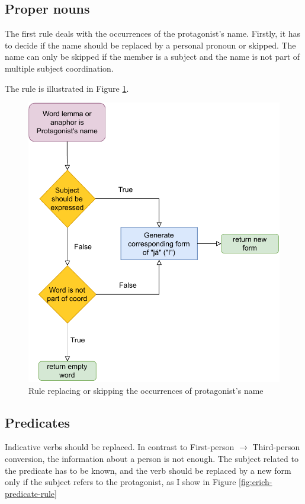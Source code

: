 \subsection{Proper nouns}

The first rule deals with the occurrences of the protagonist's name. Firstly, it has to decide if the name should be replaced by a personal pronoun or skipped. The name can only be skipped if the member is a subject and the name is not part of multiple subject coordination.

The rule is illustrated in Figure \ref{fig:erich-name-rule}.

\begin{figure}[!htbp]
\includegraphics[width=\textwidth]{data/Erich-Name-Rule.pdf}
\caption{Rule replacing or skipping the occurrences of protagonist's name}
\label{fig:erich-name-rule}
\end{figure}

\subsection{Predicates}

Indicative verbs should be replaced. In contrast to First-person $\rightarrow$ Third-person conversion, the information about a person is not enough. The subject related to the predicate has to be known, and the verb should be replaced by a new form only if the subject refers to the protagonist, as I show in Figure \ref{fig:erich-predicate-rule}

